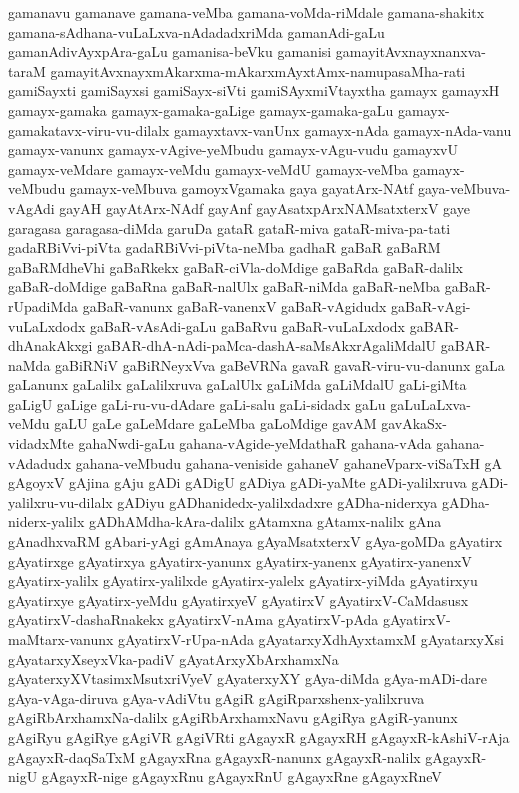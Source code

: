 {gamanavu
gamanave
gamana-veMba
gamana-voMda-riMdale
gamana-shakitx
gamana-sAdhana-vuLaLxva-nAdadadxriMda
gamanAdi-gaLu
gamanAdivAyxpAra-gaLu
gamanisa-beVku
gamanisi
gamayitAvxnayxnanxva-taraM
gamayitAvxnayxmAkarxma-mAkarxmAyxtAmx-namupasaMha-rati
gamiSayxti
gamiSayxsi
gamiSayx-siVti
gamiSAyxmiVtayxtha
gamayx
gamayxH
gamayx-gamaka
gamayx-gamaka-gaLige
gamayx-gamaka-gaLu
gamayx-gamakatavx-viru-vu-dilalx
gamayxtavx-vanUnx
gamayx-nAda
gamayx-nAda-vanu
gamayx-vanunx
gamayx-vAgive-yeMbudu
gamayx-vAgu-vudu
gamayxvU
gamayx-veMdare
gamayx-veMdu
gamayx-veMdU
gamayx-veMba
gamayx-veMbudu
gamayx-veMbuva
gamoyxVgamaka
gaya
gayatArx-NAtf
gaya-veMbuva-vAgAdi
gayAH
gayAtArx-NAdf
gayAnf
gayAsatxpArxNAMsatxterxV
gaye
garagasa
garagasa-diMda
garuDa
gataR
gataR-miva
gataR-miva-pa-tati
gadaRBiVvi-piVta
gadaRBiVvi-piVta-neMba
gadhaR
gaBaR
gaBaRM
gaBaRMdheVhi
gaBaRkekx
gaBaR-ciVla-doMdige
gaBaRda
gaBaR-dalilx
gaBaR-doMdige
gaBaRna
gaBaR-nalUlx
gaBaR-niMda
gaBaR-neMba
gaBaR-rUpadiMda
gaBaR-vanunx
gaBaR-vanenxV
gaBaR-vAgidudx
gaBaR-vAgi-vuLaLxdodx
gaBaR-vAsAdi-gaLu
gaBaRvu
gaBaR-vuLaLxdodx
gaBAR-dhAnakAkxgi
gaBAR-dhA-nAdi-paMca-dashA-saMsAkxrAgaliMdalU
gaBAR-naMda
gaBiRNiV
gaBiRNeyxVva
gaBeVRNa
gavaR
gavaR-viru-vu-danunx
gaLa
gaLanunx
gaLalilx
gaLalilxruva
gaLalUlx
gaLiMda
gaLiMdalU
gaLi-giMta
gaLigU
gaLige
gaLi-ru-vu-dAdare
gaLi-salu
gaLi-sidadx
gaLu
gaLuLaLxva-veMdu
gaLU
gaLe
gaLeMdare
gaLeMba
gaLoMdige
gavAM
gavAkaSx-vidadxMte
gahaNwdi-gaLu
gahana-vAgide-yeMdathaR
gahana-vAda
gahana-vAdadudx
gahana-veMbudu
gahana-veniside
gahaneV
gahaneVparx-viSaTxH
gA
gAgoyxV
gAjina
gAju
gADi
gADigU
gADiya
gADi-yaMte
gADi-yalilxruva
gADi-yalilxru-vu-dilalx
gADiyu
gADhanidedx-yalilxdadxre
gADha-niderxya
gADha-niderx-yalilx
gADhAMdha-kAra-dalilx
gAtamxna
gAtamx-nalilx
gAna
gAnadhxvaRM
gAbari-yAgi
gAmAnaya
gAyaMsatxterxV
gAya-goMDa
gAyatirx
gAyatirxge
gAyatirxya
gAyatirx-yanunx
gAyatirx-yanenx
gAyatirx-yanenxV
gAyatirx-yalilx
gAyatirx-yalilxde
gAyatirx-yalelx
gAyatirx-yiMda
gAyatirxyu
gAyatirxye
gAyatirx-yeMdu
gAyatirxyeV
gAyatirxV
gAyatirxV-CaMdasusx
gAyatirxV-dashaRnakekx
gAyatirxV-nAma
gAyatirxV-pAda
gAyatirxV-maMtarx-vanunx
gAyatirxV-rUpa-nAda
gAyatarxyXdhAyxtamxM
gAyatarxyXsi
gAyatarxyXseyxVka-padiV
gAyatArxyXbArxhamxNa
gAyaterxyXVtasimxMsutxriVyeV
gAyaterxyXY
gAya-diMda
gAya-mADi-dare
gAya-vAga-diruva
gAya-vAdiVtu
gAgiR
gAgiRparxshenx-yalilxruva
gAgiRbArxhamxNa-dalilx
gAgiRbArxhamxNavu
gAgiRya
gAgiR-yanunx
gAgiRyu
gAgiRye
gAgiVR
gAgiVRti
gAgayxR
gAgayxRH
gAgayxR-kAshiV-rAja
gAgayxR-daqSaTxM
gAgayxRna
gAgayxR-nanunx
gAgayxR-nalilx
gAgayxR-nigU
gAgayxR-nige
gAgayxRnu
gAgayxRnU
gAgayxRne
gAgayxRneV
}
